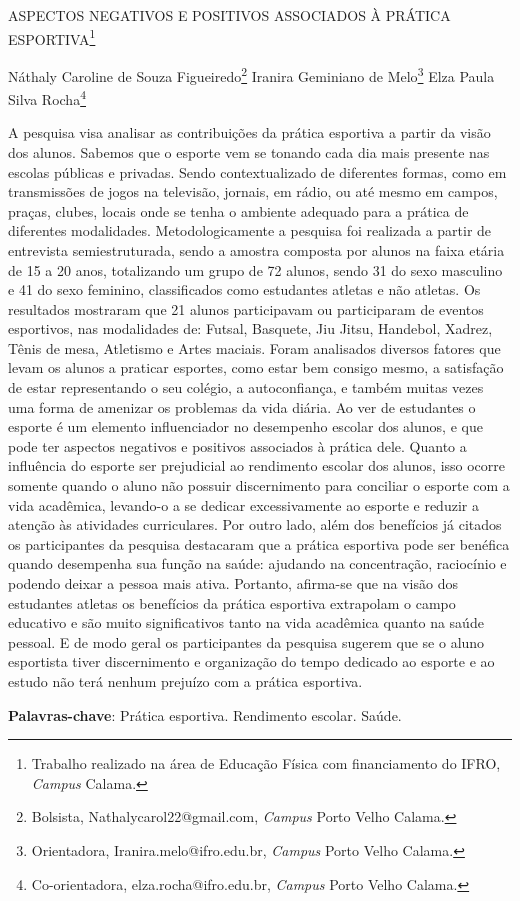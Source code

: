 \documentclass[article,12pt,onesidea,4paper,english,brazil]{abntex2}
\begin{document}
	
	
	\frenchspacing 
	
	\begin{center}
		\LARGE ASPECTOS NEGATIVOS E POSITIVOS ASSOCIADOS À PRÁTICA ESPORTIVA\footnote{Trabalho realizado na área de Educação Física com financiamento do IFRO, \textit{Campus} Calama.}
		
		\normalsize
		Náthaly Caroline de Souza Figueiredo\footnote{Bolsista, Nathalycarol22@gmail.com, \textit{Campus} Porto Velho Calama.} 
		Iranira Geminiano de Melo\footnote{Orientadora, Iranira.melo@ifro.edu.br, \textit{Campus} Porto Velho Calama.} 
		Elza Paula Silva Rocha\footnote{Co-orientadora, elza.rocha@ifro.edu.br, \textit{Campus} Porto Velho Calama.} 
	\end{center}
	
	\noindent A pesquisa visa analisar as contribuições da prática esportiva a partir da visão
	dos alunos. Sabemos que o esporte vem se tonando cada dia mais presente nas
	escolas públicas e privadas. Sendo contextualizado de diferentes formas, como em
	transmissões de jogos na televisão, jornais, em rádio, ou até mesmo em campos,
	praças, clubes, locais onde se tenha o ambiente adequado para a prática de
	diferentes modalidades. Metodologicamente a pesquisa foi realizada a partir de
	entrevista semiestruturada, sendo a amostra composta por alunos na faixa etária de
	15 a 20 anos, totalizando um grupo de 72 alunos, sendo 31 do sexo masculino e 41
	do sexo feminino, classificados como estudantes atletas e não atletas. Os resultados
	mostraram que 21 alunos participavam ou participaram de eventos esportivos, nas
	modalidades de: Futsal, Basquete, Jiu Jitsu, Handebol, Xadrez, Tênis de mesa,
	Atletismo e Artes maciais. Foram analisados diversos fatores que levam os alunos a
	praticar esportes, como estar bem consigo mesmo, a satisfação de estar
	representando o seu colégio, a autoconfiança, e também muitas vezes uma forma
	de amenizar os problemas da vida diária. Ao ver de estudantes o esporte é um
	elemento influenciador no desempenho escolar dos alunos, e que pode ter aspectos
	negativos e positivos associados à prática dele. Quanto a influência do esporte ser
	prejudicial ao rendimento escolar dos alunos, isso ocorre somente quando o aluno
	não possuir discernimento para conciliar o esporte com a vida acadêmica, levando-o
	a se dedicar excessivamente ao esporte e reduzir a atenção às atividades
	curriculares. Por outro lado, além dos benefícios já citados os participantes da
	pesquisa destacaram que a prática esportiva pode ser benéfica quando
	desempenha sua função na saúde: ajudando na concentração, raciocínio e podendo
	deixar a pessoa mais ativa. Portanto, afirma-se que na visão dos estudantes atletas
	os benefícios da prática esportiva extrapolam o campo educativo e são muito
	significativos tanto na vida acadêmica quanto na saúde pessoal. E de modo geral os
	participantes da pesquisa sugerem que se o aluno esportista tiver discernimento e
	organização do tempo dedicado ao esporte e ao estudo não terá nenhum prejuízo
	com a prática esportiva.
	
	\vspace{\onelineskip}
	
	\noindent
	\textbf{Palavras-chave}: Prática esportiva. Rendimento escolar. Saúde.
	
\end{document}

